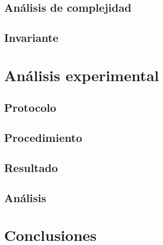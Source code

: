 \documentclass[letter]{article}
\begin{document}
\subsection{An\'alisis de complejidad}
\subsection{Invariante}
\section{An\'alisis experimental}
\subsection{Protocolo}
\subsection{Procedimiento}
\subsection{Resultado}
\subsection{An\'alisis}
\section{Conclusiones}
\end{document}

